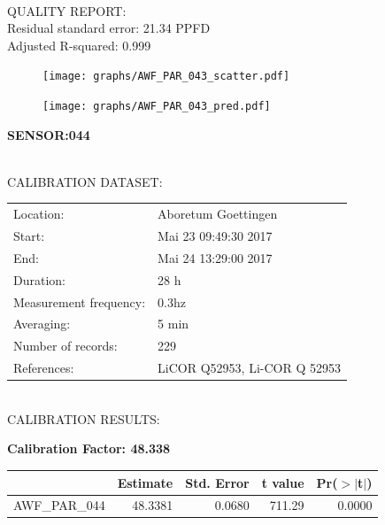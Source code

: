 \documentclass[oneside]{report}
\begin{document}
\hrulefill\\
QUALITY REPORT:\\
Residual standard error: 21.34 PPFD\\
Adjusted R-squared: 0.999



\begin{figure}[H]
  \centering
  \texttt{[image: graphs/AWF\_PAR\_043\_scatter.pdf]}
\end{figure}




\begin{figure}[H]
  \centering
  \texttt{[image: graphs/AWF\_PAR\_043\_pred.pdf]}
\end{figure}

\pagebreak


\begin{center}
\large{\textbf{SENSOR:044}}\\
\end{center}

\hrulefill\\
CALIBRATION DATASET:\\
\begin{table}[h!]
  \centering
  \label{tab:table1}
  \begin{tabular}{ll}
    Location: & Aboretum Goettingen\\ 
    
    
    Start:  & Mai 23 09:49:30 2017 \\
    End:   & Mai 24 13:29:00 2017\\ 
    Duration: & 28 h\\
    Measurement frequency: & 0.3hz\\
    Averaging:  &5 min\\
    Number of records: & 229 \\
    References: & LiCOR Q52953, Li-COR Q 52953 \\
  \end{tabular}
\end{table}

\hrulefill\\
CALIBRATION RESULTS:\\


\begin{center}
\textbf{\large{Calibration Factor: 48.338}}\\
\end{center}
\begin{table}[ht]
\centering
\begin{tabular}{rrrrr}
  \hline
 & Estimate & Std. Error & t value & Pr($>$$|$t$|$) \\ 
  \hline
AWF\_PAR\_044 & 48.3381 & 0.0680 & 711.29 & 0.0000 \\ 
   \hline
\end{tabular}
\end{table}
\end{document}
